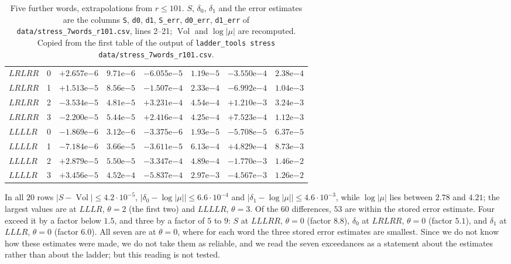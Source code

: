 \documentclass[11pt]{amsart}
\theoremstyle{definition}
\theoremstyle{remark}
\newcommand{\Vol}{\operatorname{Vol}}
\begin{document}
\begin{table}[ht]
\begin{tabular}{llcccccc}
$LRLRR$ & 0 & $+2.657\mathrm{e}{-6}$ & $9.71\mathrm{e}{-6}$ & $-6.055\mathrm{e}{-5}$ & $1.19\mathrm{e}{-5}$ & $-3.550\mathrm{e}{-4}$ & $2.38\mathrm{e}{-4}$ \\
$LRLRR$ & 1 & $+1.513\mathrm{e}{-5}$ & $8.56\mathrm{e}{-5}$ & $-1.507\mathrm{e}{-4}$ & $2.33\mathrm{e}{-4}$ & $-6.992\mathrm{e}{-4}$ & $1.04\mathrm{e}{-3}$ \\
$LRLRR$ & 2 & $-3.534\mathrm{e}{-5}$ & $4.81\mathrm{e}{-5}$ & $+3.231\mathrm{e}{-4}$ & $4.54\mathrm{e}{-4}$ & $+1.210\mathrm{e}{-3}$ & $3.24\mathrm{e}{-3}$ \\
$LRLRR$ & 3 & $-2.200\mathrm{e}{-5}$ & $5.44\mathrm{e}{-5}$ & $+2.416\mathrm{e}{-4}$ & $4.25\mathrm{e}{-4}$ & $+7.523\mathrm{e}{-4}$ & $1.12\mathrm{e}{-3}$ \\
$LLLLR$ & 0 & $-1.869\mathrm{e}{-6}$ & $3.12\mathrm{e}{-6}$ & $-3.375\mathrm{e}{-6}$ & $1.93\mathrm{e}{-5}$ & $-5.708\mathrm{e}{-5}$ & $6.37\mathrm{e}{-5}$ \\
$LLLLR$ & 1 & $-7.184\mathrm{e}{-6}$ & $3.66\mathrm{e}{-5}$ & $-3.611\mathrm{e}{-5}$ & $6.13\mathrm{e}{-4}$ & $+4.829\mathrm{e}{-4}$ & $8.73\mathrm{e}{-3}$ \\
$LLLLR$ & 2 & $+2.879\mathrm{e}{-5}$ & $5.50\mathrm{e}{-5}$ & $-3.347\mathrm{e}{-4}$ & $4.89\mathrm{e}{-4}$ & $-1.770\mathrm{e}{-3}$ & $1.46\mathrm{e}{-2}$ \\
$LLLLR$ & 3 & $+3.456\mathrm{e}{-5}$ & $4.52\mathrm{e}{-4}$ & $-5.837\mathrm{e}{-4}$ & $2.97\mathrm{e}{-3}$ & $-4.567\mathrm{e}{-3}$ & $1.26\mathrm{e}{-2}$ \\
\bottomrule
\end{tabular}
\caption{Five further words, extrapolations from $r \le 101$. $S$, $\delta_0$,
$\delta_1$ and the error estimates are the columns \texttt{S}, \texttt{d0},
\texttt{d1}, \texttt{S\_err}, \texttt{d0\_err}, \texttt{d1\_err} of
\texttt{data/stress\_7words\_r101.csv}, lines 2--21; $\Vol$ and $\log|\mu|$ are
recomputed. Copied from the first table of the output of \texttt{ladder\_tools stress
data/stress\_7words\_r101.csv}.}
\label{tab:fivewords}
\end{table}

In all $20$ rows $|S - \Vol| \le 4.2\cdot10^{-5}$,
$|\delta_0 - \log|\mu|| \le 6.6\cdot10^{-4}$ and
$|\delta_1 - \log|\mu|| \le 4.6\cdot10^{-3}$, while $\log|\mu|$ lies between $2.78$
and $4.21$; the largest values are at $LLLR$, $\theta = 2$ (the first two) and
$LLLLR$, $\theta = 3$. Of the $60$ differences, $53$ are within the stored error
estimate. Four exceed it by a factor below $1.5$, and three by a factor of $5$ to $9$:
$S$ at $LLLRR$, $\theta = 0$ (factor $8.8$), $\delta_0$ at $LRLRR$, $\theta = 0$ (factor
$5.1$), and $\delta_1$ at $LLLR$, $\theta = 0$ (factor $6.0$). All seven are at
$\theta = 0$, where for each word the three stored error estimates are smallest. Since we do not know how
these estimates were made, we do not take them as reliable, and we read the seven
exceedances as a statement about the estimates rather than about the ladder; but this
reading is not tested.
\end{document}
